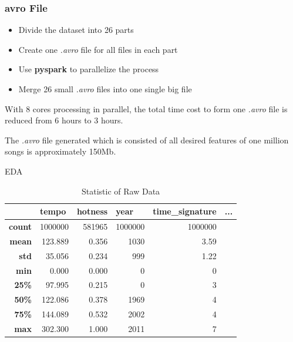 \documentclass{beamer}
\begin{document}
\begin{frame}[fragile]
\frametitle{avro File}
    \begin{itemize}
        \item Divide the dataset into 26 parts
        \item Create one \textit{.avro} file for all files in each part
        \item Use \textbf{pyspark} to parallelize the process
        \item Merge 26 small \textit{.avro} files into one single big file
    \end{itemize}
    \vspace{0.5cm}
    With 8 cores processing in parallel, the total time cost to form one \textit{.avro} file is reduced from 6 hours to 3 hours.
    
    \vspace{0.2cm}
    
    The \textit{.avro} file generated which is consisted of all desired features of one million songs is approximately 150Mb.
\end{frame}

\begin{frame}{EDA}


\begin{table}[htbp]
\captionsetup{font=small}
  \centering
  \caption{Statistic of Raw Data}
    \begin{tabular}{rrrrrr}
          & \multicolumn{1}{l}{\textbf{tempo}} & \multicolumn{1}{l}{\textbf{hotness}} & \multicolumn{1}{l}{\textbf{year}} & \multicolumn{1}{l}{\textbf{time\_signature}} & \multicolumn{1}{l}{\textbf{...}}\\
    \midrule
    \textbf{count} & 1000000 & {\color{red} 581965} & 1000000 & 1000000 & \\
    \textbf{mean} & 123.889 & 0.356 & {\color{red}1030}  & 3.59 &\\
    \textbf{std} & 35.056 & 0.234 & 999   & 1.22 &\\
    \textbf{min} & 0.000 & 0.000 & 0     & 0 &\\
    \textbf{25\%} & 97.995 & 0.215 & 0     & 3 &\\
    \textbf{50\%} & 122.086 & 0.378 & 1969  & 4 &\\
    \textbf{75\%} & 144.089 & 0.532 & 2002  & 4 &\\
    \textbf{max} & 302.300 & 1.000 & 2011  & 7 &\\
    \end{tabular}%
  \label{tab:addlabel}%
  
\end{table}%



\end{frame}
\end{document}
